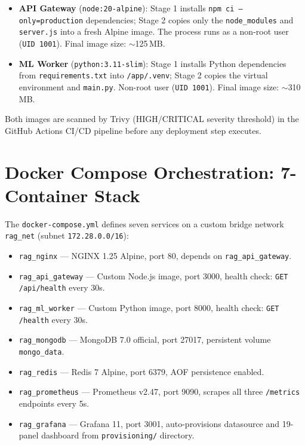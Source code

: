 \documentclass[12pt,a4paper]{report}
\begin{document}
\begin{itemize}[leftmargin=1.5cm]
  \item \textbf{API Gateway} (\texttt{node:20-alpine}): Stage 1 installs
        \texttt{npm ci --only=production} dependencies; Stage 2 copies only
        the \texttt{node\_modules} and \texttt{server.js} into a fresh Alpine
        image. The process runs as a non-root user (\texttt{UID 1001}).
        Final image size: $\sim$125\,MB.
  \item \textbf{ML Worker} (\texttt{python:3.11-slim}): Stage 1 installs
        Python dependencies from \texttt{requirements.txt} into
        \texttt{/app/.venv}; Stage 2 copies the virtual environment and
        \texttt{main.py}. Non-root user (\texttt{UID 1001}).
        Final image size: $\sim$310\,MB.
\end{itemize}

Both images are scanned by Trivy (HIGH/CRITICAL severity threshold) in the
GitHub Actions CI/CD pipeline before any deployment step executes.

\section{Docker Compose Orchestration: 7-Container Stack}

The \texttt{docker-compose.yml} defines seven services on a custom bridge
network \texttt{rag\_net} (subnet \texttt{172.28.0.0/16}):

\begin{itemize}[leftmargin=1.5cm]
  \item \texttt{rag\_nginx} — NGINX 1.25 Alpine, port 80, depends on
        \texttt{rag\_api\_gateway}.
  \item \texttt{rag\_api\_gateway} — Custom Node.js image, port 3000,
        health check: \texttt{GET /api/health} every 30s.
  \item \texttt{rag\_ml\_worker} — Custom Python image, port 8000,
        health check: \texttt{GET /health} every 30s.
  \item \texttt{rag\_mongodb} — MongoDB 7.0 official, port 27017,
        persistent volume \texttt{mongo\_data}.
  \item \texttt{rag\_redis} — Redis 7 Alpine, port 6379, AOF persistence enabled.
  \item \texttt{rag\_prometheus} — Prometheus v2.47, port 9090, scrapes all
        three \texttt{/metrics} endpoints every 5s.
  \item \texttt{rag\_grafana} — Grafana 11, port 3001, auto-provisions
        datasource and 19-panel dashboard from \texttt{provisioning/} directory.
\end{itemize}
\end{document}
